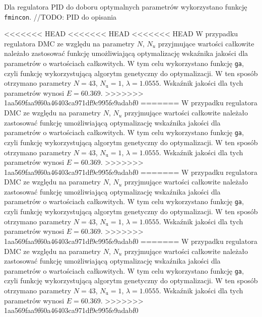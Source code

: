 Dla regulatora PID do doboru optymalnych parametrów wykorzystano funkcję 
\verb+fmincon+. //TODO: PID do opisania

<<<<<<< HEAD
<<<<<<< HEAD
<<<<<<< HEAD
W przypadku regulatora DMC ze względu na parametry $N$, $N_u$ przyjmujące wartości całkowite należało zastosować funkcję umożliwiającą optymalizację wskaźnika jakości dla parametrów o wartościach całkowitych. W tym celu wykorzystano funkcję \verb+ga+, czyli funkcję wykorzystującą algorytm genetyczny do optymalizacji. W ten sposób otrzymano parametry $N=43$, $N_\mathrm{u}=1$, $\lambda=\num{1.0555}$. Wskaźnik jakości dla tych parametrów wynosi $E=\num{60.369}$.
>>>>>>> 1aa569faa9f60a46403ca971df9c995fe9adabf0
=======
W przypadku regulatora DMC ze względu na parametry $N$, $N_u$ przyjmujące wartości całkowite należało zastosować funkcję umożliwiającą optymalizację wskaźnika jakości dla parametrów o wartościach całkowitych. W tym celu wykorzystano funkcję \verb+ga+, czyli funkcję wykorzystującą algorytm genetyczny do optymalizacji. W ten sposób otrzymano parametry $N=43$, $N_\mathrm{u}=1$, $\lambda=\num{1.0555}$. Wskaźnik jakości dla tych parametrów wynosi $E=\num{60.369}$.
>>>>>>> 1aa569faa9f60a46403ca971df9c995fe9adabf0
=======
W przypadku regulatora DMC ze względu na parametry $N$, $N_u$ przyjmujące wartości całkowite należało zastosować funkcję umożliwiającą optymalizację wskaźnika jakości dla parametrów o wartościach całkowitych. W tym celu wykorzystano funkcję \verb+ga+, czyli funkcję wykorzystującą algorytm genetyczny do optymalizacji. W ten sposób otrzymano parametry $N=43$, $N_\mathrm{u}=1$, $\lambda=\num{1.0555}$. Wskaźnik jakości dla tych parametrów wynosi $E=\num{60.369}$.
>>>>>>> 1aa569faa9f60a46403ca971df9c995fe9adabf0
=======
W przypadku regulatora DMC ze względu na parametry $N$, $N_u$ przyjmujące wartości całkowite należało zastosować funkcję umożliwiającą optymalizację wskaźnika jakości dla parametrów o wartościach całkowitych. W tym celu wykorzystano funkcję \verb+ga+, czyli funkcję wykorzystującą algorytm genetyczny do optymalizacji. W ten sposób otrzymano parametry $N=43$, $N_\mathrm{u}=1$, $\lambda=\num{1.0555}$. Wskaźnik jakości dla tych parametrów wynosi $E=\num{60.369}$.
>>>>>>> 1aa569faa9f60a46403ca971df9c995fe9adabf0
